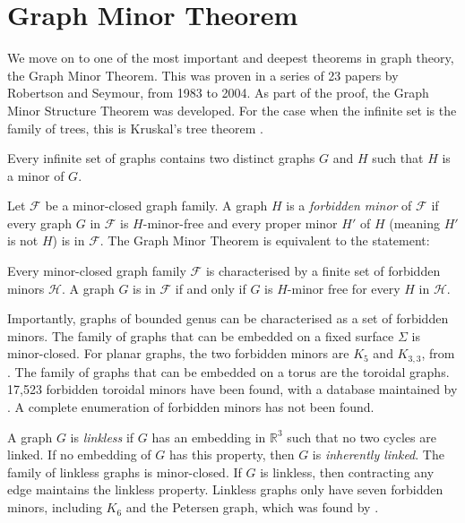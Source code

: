\section{Graph Minor Theorem}\label{sec:Graph Minor Theorem}
We move on to one of the most important and deepest theorems in graph theory, the Graph Minor Theorem. This was proven in a series of 23 papers by Robertson and Seymour, from 1983 to 2004. As part of the proof, the Graph Minor Structure Theorem was developed. For the case when the infinite set is the family of trees, this is Kruskal's tree theorem \cite{kruskalWellQuasiOrderingTreeTheorem1960}. 
\begin{theorem}
	Every infinite set of graphs contains two distinct graphs \(G\) and \(H\) such that \(H\) is a minor of \(G\).
\end{theorem}
Let $\mathcal{F}$ be a minor-closed graph family. A graph $H$ is a \textit{forbidden minor} of $\mathcal{F}$ if every graph $G$ in $\mathcal{F}$ is $H$-minor-free and every proper minor $H'$ of $H$ (meaning $H'$ is not $H$) is in $\mathcal{F}$. 
The Graph Minor Theorem is equivalent to the statement:
\begin{theorem}
	Every minor-closed graph family $\mathcal{F}$ is characterised by a finite set of forbidden minors $\mathcal{H}$. A graph $G$ is in $\mathcal{F}$ if and only if $G$ is $H$-minor free for every $H$ in $\mathcal{H}$. 
\end{theorem}
Importantly, graphs of bounded genus can be characterised as a set of forbidden minors. The family of graphs that can be embedded on a fixed surface $\Sigma$ is minor-closed. 
For planar graphs, the two forbidden minors are \(K_5\) and \(K_{3,3}\), from \textcite{wagnerUeberEigenschaftEbenen1937}. 
The family of graphs that can be embedded on a torus are the toroidal graphs. 17,523 forbidden toroidal minors have been found, with a database maintained by \textcite{myrvoldLargeSetTorus2018}. A complete enumeration of forbidden minors has not been found. 

A graph $G$ is \textit{linkless} if $G$ has an embedding in $\mathbb{R}^3$ such that no two cycles are linked. If no embedding of $G$ has this property, then $G$ is \textit{inherently linked}. The family of linkless graphs is minor-closed. If $G$ is linkless, then contracting any edge maintains the linkless property. Linkless graphs only have seven forbidden minors, including $K_6$ and the Petersen graph, which was found by \textcite{robertsonSachsLinklessEmbedding1995}. 

